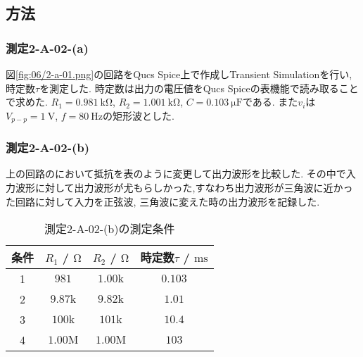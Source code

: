 \subsection{方法}
\subsubsection{測定2-A-02-(a)}
図\ref{fig:06/2-a-01.png}の回路をQucs Spice上で作成しTransient Simulationを行い,時定数$\tau$を測定した.
時定数は出力の電圧値をQucs Spiceの表機能で読み取ることで求めた.
$R_1=0.981\ \si{\kilo\ohm}$, $R_2=1.001\ \si{\kilo\ohm}$, $C=0.103\ \si{\micro\farad}$である.
また$v_i$は$V_{p-p}=1\ \si{\volt}$, $f=80\ \si{\hertz}$の矩形波とした.

\subsubsection{測定2-A-02-(b)}
上の回路のにおいて抵抗を表のように変更して出力波形を比較した.
その中で入力波形に対して出力波形が尤もらしかった,すなわち出力波形が三角波に近かった回路に対して入力を正弦波,
三角波に変えた時の出力波形を記録した.
\begin{table}[h]
\caption{測定2-A-02-(b)の測定条件}
\label{tab:2-A-02-(b)}
\centering
\begin{tabular}{cccc}
\hline
条件&$R_1$ / $\si{\ohm}$&$R_2$ / $\si{\ohm}$&時定数$\tau$ / $\si{\milli\second}$\\
\hline \hline
1&$981$&$1.00\si{\kilo}$&$0.103$\\
2&$9.87\si{\kilo}$&$9.82\si{\kilo}$&$1.01$\\
3&$100\si{\kilo}$&$101\si{\kilo}$&$10.4$\\
4&$1.00\si{\mega}$&$1.00\si{\mega}$&$103$\\
\hline
\end{tabular}
\end{table}